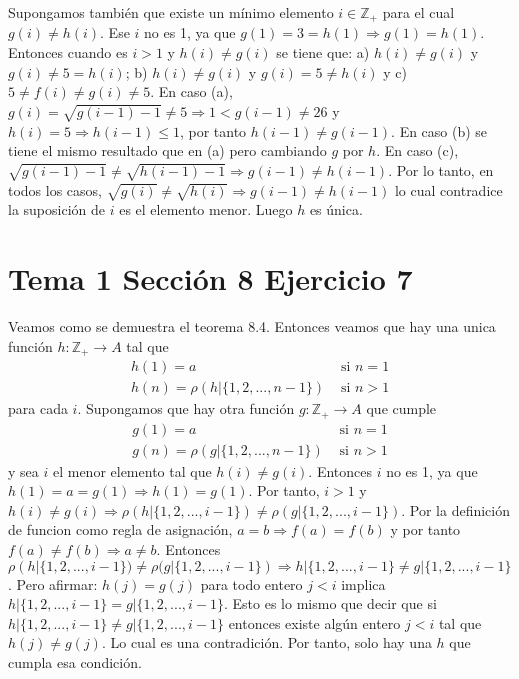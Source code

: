 \documentclass{article}
\begin{document}
Supongamos también que existe un mínimo elemento $i\in \mathbb{Z}_{+}$ para el cual $g(i)\neq h(i)$. Ese $i$ no es 1, ya que  $g(1)=3=h(1)\Rightarrow g(1)=h(1)$. Entonces cuando es $i>1$ y $h(i)\neq g(i)$ se tiene que: a) $h(i)\neq g(i)$ y $g(i)\neq 5 = h(i)$; b) $h(i)\neq g(i)$ y $g(i)= 5 \neq h(i)$ y c) $5\neq f(i)\neq g(i)\neq 5$. En caso (a), $g(i)=\sqrt{g(i-1)-1}\neq 5\Rightarrow 1<g(i-1)\neq 26$ y $h(i)=5\Rightarrow h(i-1)\leq 1$, por tanto $h(i-1)\neq g(i-1)$. En caso  (b) se tiene el mismo resultado que en (a) pero cambiando $g$ por $h$. En caso (c), $\sqrt{g(i-1)-1}\neq \sqrt{h(i-1)-1}\Rightarrow g(i-1)\neq h(i-1)$. Por lo tanto, en todos los casos, $\sqrt{g(i)}\neq \sqrt{h(i)}\Rightarrow g(i-1)\neq h(i-1)$  lo cual  contradice la suposición de $i$ es el elemento menor. Luego $h$ es única.
\section{Tema 1 Sección 8 Ejercicio 7}
Veamos como se demuestra el teorema 8.4. Entonces veamos que hay una unica función $h:\mathbb{Z}_{+}\rightarrow A$ tal que
\begin{eqnarray}
h(1)=a & \text{ si }n=1 \nonumber\\
h(n)=\rho(h|\{1,2,...,n-1\}) & \text{ si }n>1 \nonumber
\end{eqnarray}
para cada $i$. Supongamos que hay otra función $g:\mathbb{Z}_{+}\rightarrow A$ que cumple
\begin{eqnarray}
g(1)=a & \text{ si }n=1 \nonumber\\
g(n)=\rho(g|\{1,2,...,n-1\}) & \text{ si }n>1 \nonumber
\end{eqnarray}
y sea $i$ el menor elemento tal que $h(i)\neq g(i)$. Entonces $i$ no es 1, ya que $h(1)=a=g(1)\Rightarrow h(1)=g(1)$. Por tanto, $i>1$ y $h(i)\neq g(i)\Rightarrow\rho(h|\{1,2,...,i-1\})\neq\rho(g|\{1,2,...,i-1\})$. Por la definición de funcion como regla de asignación, $a=b\Rightarrow f(a)=f(b)$ y por tanto $f(a)\neq f(b)\Rightarrow a\neq b$. Entonces $\rho(h|\{1,2,...,i-1\})\neq\rho(g|\{1,2,...,i-1\})\Rightarrow h|\{1,2,...,i-1\}\neq g|\{1,2,...,i-1\}$. Pero afirmar: $h(j)=g(j)$ para todo  entero $j<i$ implica $h|\{1,2,...,i-1\}=g|\{1,2,...,i-1\}$. Esto es lo mismo que decir que si $h|\{1,2,...,i-1\}\neq g|\{1,2,...,i-1\}$ entonces existe algún entero $j<i$ tal que $h(j)\neq g(j)$. Lo cual es una contradición. Por tanto, solo hay una $h$ que cumpla esa condición.
\end{document}
